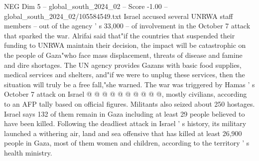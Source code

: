 \begin{textsample}{NEG Dim 5 – global\_south\_2024\_02 – Score -1.00 – global\_south\_2024\_02/105584549.txt}
Israel accused several UNRWA staff members -- out of the agency ' s 33,000 -- of involvement in the October 7 attack that sparked the war.
Alrifai said that"if the countries that suspended their funding to UNRWA maintain their decision, the impact will be catastrophic on the people of Gaza"who face mass displacement, threats of disease and famine and dire shortages.
The UN agency provides Gazans with basic food supplies, medical services and shelters, and"if we were to unplug these services, then the situation will truly be a free fall,"she warned.
The war was triggered by Hamas ' s October 7 attack on Israel @ @ @ @ @ @ @ @ @ @, mostly civilians, according to an AFP tally based on official figures.
Militants also seized about 250 hostages.
Israel says 132 of them remain in Gaza including at least 29 people believed to have been killed.
Following the deadliest attack in Israel ' s history, its military launched a withering air, land and sea offensive that has killed at least 26,900 people in Gaza, most of them women and children, according to the territory ' s health ministry.

\end{textsample}
